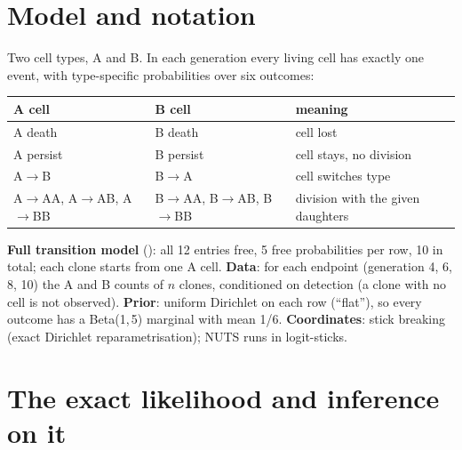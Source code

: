 \documentclass[10pt,a4paper]{article}
\newcommand{\BA}{B$\to$A}
\begin{document}
\section{Model and notation}\label{sec:model}
Two cell types, A and B. In each generation every living cell has exactly one event, with type-specific probabilities over six outcomes:
\begin{center}\small
\begin{tabular}{@{}lll@{}}\toprule
A cell & B cell & meaning \\\midrule
A death & B death & cell lost \\
A persist & B persist & cell stays, no division \\
A$\to$B & \BA & cell switches type \\
A$\to$AA, A$\to$AB, A$\to$BB & B$\to$AA, B$\to$AB, B$\to$BB & division with the given daughters \\\bottomrule
\end{tabular}
\end{center}
\textbf{Full transition model} (): all 12 entries free, 5 free probabilities per row, 10 in total; each clone starts from one A cell. \textbf{Data}: for each endpoint (generation 4, 6, 8, 10) the A and B counts of $n$ clones, conditioned on detection (a clone with no cell is not observed). \textbf{Prior}: uniform Dirichlet on each row (``flat''), so every outcome has a Beta(1,\,5) marginal with mean 1/6. \textbf{Coordinates}: stick breaking (exact Dirichlet reparametrisation); NUTS runs in logit-sticks.

\section{The exact likelihood and inference on it}\label{sec:method}
\end{document}
